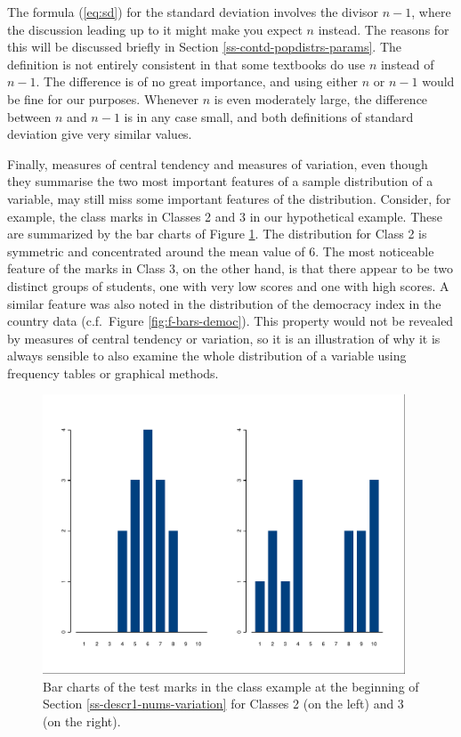 \documentclass[11pt,a4paper,openany]{book}
\begin{document}
The formula (\ref{eq:sd}) for the standard deviation involves the
divisor \(n-1\), where the discussion leading up to it might make you
expect \(n\) instead. The reasons for this will be discussed briefly in
Section \ref{ss-contd-popdistrs-params}. The definition is not entirely
consistent in that some textbooks do use \(n\) instead of \(n-1\). The
difference is of no great importance, and using either \(n\) or \(n-1\)
would be fine for our purposes. Whenever \(n\) is even moderately large,
the difference between \(n\) and \(n-1\) is in any case small, and both
definitions of standard deviation give very similar values.

Finally, measures of central tendency and measures of variation, even
though they summarise the two most important features of a sample
distribution of a variable, may still miss some important features of
the distribution. Consider, for example, the class marks in Classes 2
and 3 in our hypothetical example. These are summarized by the bar
charts of Figure \ref{fig:f-classbars}. The distribution for Class 2 is
symmetric and concentrated around the mean value of 6. The most
noticeable feature of the marks in Class 3, on the other hand, is that
there appear to be two distinct groups of students, one with very low
scores and one with high scores. A similar feature was also noted in the
distribution of the democracy index in the country data (c.f.~Figure
\ref{fig:f-bars-democ}). This property would not be revealed by measures
of central tendency or variation, so it is an illustration of why it is
always sensible to also examine the whole distribution of a variable
using frequency tables or graphical methods.

\begin{figure}[htbp]
\centering
\includegraphics[height=8.30000cm]{classbars.pdf}
\caption{\label{fig:f-classbars} Bar charts of the test marks in the class
example at the beginning of Section \ref{ss-descr1-nums-variation} for
Classes 2 (on the left) and 3 (on the right).}
\end{figure}
\end{document}
